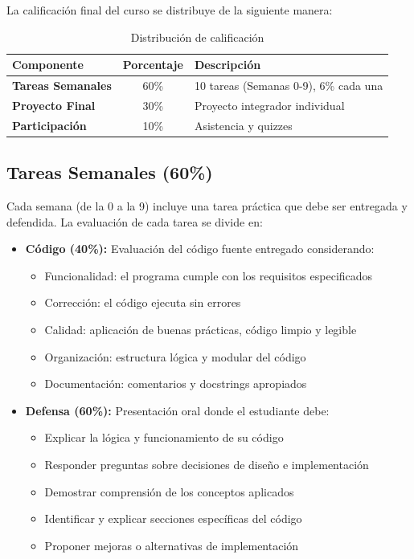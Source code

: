 \documentclass[12pt,letterpaper]{article}
\begin{document}
La calificación final del curso se distribuye de la siguiente manera:

\begin{table}[h]
\centering
\begin{tabularx}{\textwidth}{|l|c|X|}
\hline
\textbf{Componente} & \textbf{Porcentaje} & \textbf{Descripción} \\
\hline
\textbf{Tareas Semanales} & 60\% & 10 tareas (Semanas 0-9), 6\% cada una \\
\hline
\textbf{Proyecto Final} & 30\% & Proyecto integrador individual \\
\hline
\textbf{Participación} & 10\% & Asistencia y quizzes \\
\hline
\end{tabularx}
\caption{Distribución de calificación}
\end{table}

\subsection{Tareas Semanales (60\%)}

Cada semana (de la 0 a la 9) incluye una tarea práctica que debe ser entregada y defendida. La evaluación de cada tarea se divide en:

\begin{itemize}[leftmargin=*]
    \item \textbf{Código (40\%):} Evaluación del código fuente entregado considerando:
    \begin{itemize}
        \item Funcionalidad: el programa cumple con los requisitos especificados
        \item Corrección: el código ejecuta sin errores
        \item Calidad: aplicación de buenas prácticas, código limpio y legible
        \item Organización: estructura lógica y modular del código
        \item Documentación: comentarios y docstrings apropiados
    \end{itemize}
    
    \item \textbf{Defensa (60\%):} Presentación oral donde el estudiante debe:
    \begin{itemize}
        \item Explicar la lógica y funcionamiento de su código
        \item Responder preguntas sobre decisiones de diseño e implementación
        \item Demostrar comprensión de los conceptos aplicados
        \item Identificar y explicar secciones específicas del código
        \item Proponer mejoras o alternativas de implementación
    \end{itemize}
\end{itemize}
\end{document}
